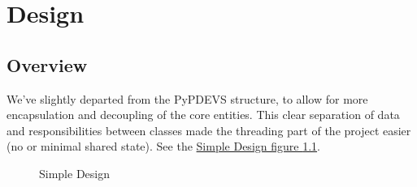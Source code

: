 \documentclass[8pt,a4paper]{report}
\begin{document}
\chapter{Design}
\section{Overview}
We've slightly departed from the PyPDEVS structure, to allow for more encapsulation and decoupling of the core entities. This clear separation of data and responsibilities between classes made the threading part of the project easier (no or minimal shared state). See the \hyperref[simpledesign]{Simple Design figure \ref*{simpledesign}}.\\

\begin{figure}[h!]
	\caption{Simple Design}
	\label{simpledesign}
\end{figure}
\end{document}
